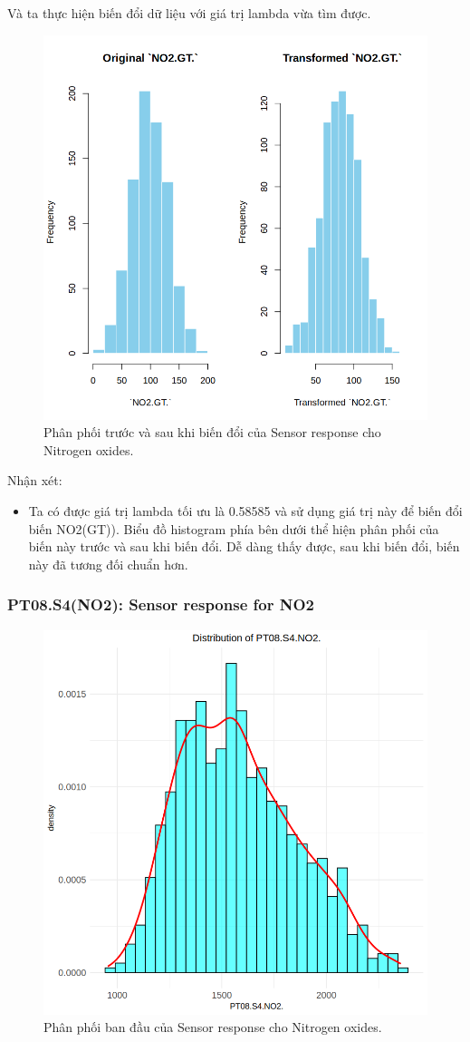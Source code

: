 Và ta thực hiện biến đổi dữ liệu với giá trị lambda vừa tìm được.
\begin{figure}[H]
    \centering
    \includegraphics[width=0.75\columnwidth]{air_figures/NO2(GT)_transformed_distribution.png}
    \caption{Phân phối trước và sau khi biến đổi của Sensor response cho Nitrogen oxides.}
    \label{fig:no2_transformed_distribution}
\end{figure}
Nhận xét:
\begin{itemize}
    \item Ta có được giá trị lambda tối ưu là 0.58585 và sử dụng giá trị này để biến đổi biến NO2(GT)). Biểu đồ histogram phía bên dưới thể hiện phân phối của biến này trước và sau khi biến đổi. Dễ dàng thấy được, sau khi biến đổi, biến này đã tương đối chuẩn hơn.
\end{itemize}

\subsubsection{PT08.S4(NO2): Sensor response for NO2}

\begin{figure}[H]
    \centering
    \includegraphics[width=0.75\columnwidth]{air_figures/PT08.S4(NO2)_original_distribution.png}
    \caption{Phân phối ban đầu của Sensor response cho Nitrogen oxides.}
    \label{fig:ptno2_original_distribution}
\end{figure}

